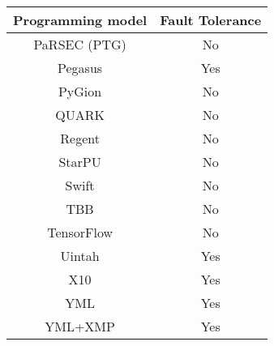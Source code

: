 \begin{tabular}{cc}
\hline
Programming model & Fault Tolerance \\
\hline
PaRSEC (PTG) & No\\
Pegasus & Yes\\
PyGion & No\\
QUARK & No\\
Regent & No\\
StarPU & No\\
Swift & No\\
TBB & No\\
TensorFlow & No\\
Uintah & Yes\\
X10 & Yes\\
YML & Yes\\
YML+XMP & Yes\\
\hline
\end{tabular}
